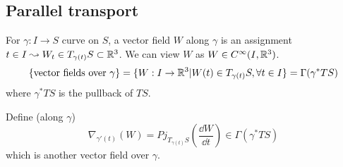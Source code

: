 \subsection{Parallel transport}
For  $ \gamma:I\rightarrow S  $ curve on  $ S $, a vector field  $ W  $ along  $ \gamma $ is an assignment  $ t\in I\leadsto W_t\in T_{\gamma(t)}S\subset\mathbb R^3 $. We can view  $ W  $ as  $ W\in C^\infty(I,\mathbb R^3) $. 
\ie 
\[\{\text{vector fields over  $ \gamma $}\}=\{W:I\rightarrow \mathbb R^3|W(t)\in T_{\gamma(t)}S,\forall t\in I\}=\Gamma(\gamma^*TS)\]
where  $ \gamma^*TS $ is the pullback of  $ TS $. 


Define  (along  $ \gamma $)
\[\nabla_{\gamma'(t)}(W)=Pj_{T_{\gamma(t)}S}\left(\frac{\dd W}{\dd t}\right)\in \Gamma(\gamma^*TS)\] 
which is another vector field over  $ \gamma $.
